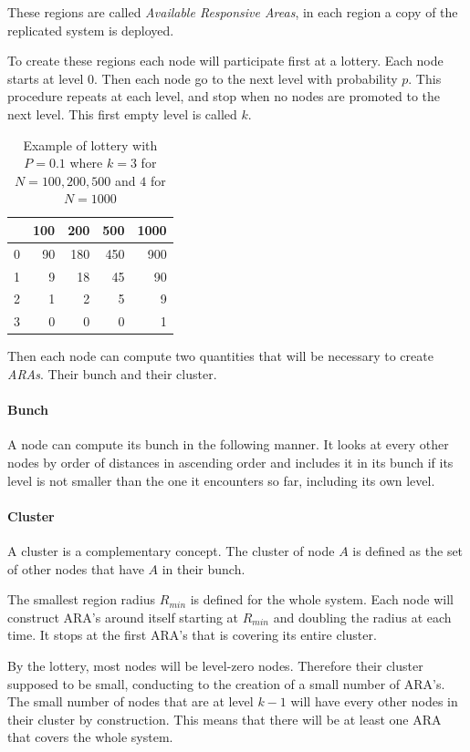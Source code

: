 \documentclass[a4paper,11pt,oneside]{report}
\begin{document}
These regions are called \textit{Available Responsive Areas}, in each region a
copy of the replicated system is deployed. 

To create these regions each node will participate first at a lottery. Each
node starts at level 0. Then each node go to the next level with probability
$p$. This procedure repeats at each level, and stop when no nodes are promoted
to the next level. This first empty level is called $k$. 

\begin{table}[] \begin{tabular}{rrrrr} & 100 & 200 & 500 & 1000 \\ \hline
\multicolumn{1}{r|}{0} & 90  & 180 & 450 & 900  \\ \multicolumn{1}{r|}{1} & 9
& 18  & 45  & 90   \\ \multicolumn{1}{r|}{2} & 1   & 2   & 5   & 9 \\
\multicolumn{1}{r|}{3} & 0   & 0   & 0   & 1   \end{tabular} \caption{Example
of lottery with $P = 0.1$ where $k= 3$ for $N= 100,200,500$ and $4$ for $N =
1000$} \end{table}

Then each node can compute two quantities that will be necessary to create
\textit{ARAs}. Their bunch and their cluster. 

\paragraph{Bunch} A node can compute its bunch in the following manner. It
looks at every other nodes by order of distances in ascending order and
includes it in its bunch if its level is not smaller than the one it encounters
so far, including its own level. 


\paragraph{Cluster} A cluster is a complementary concept. The cluster of node
$A$ is defined as the set of other nodes that have $A$ in their bunch. 

The smallest region radius $R_{min}$ is defined for the whole system. Each node
will construct ARA's around itself starting at $R_{min}$ and doubling the
radius at each time. It stops at the first ARA's that is covering its entire
cluster. 

By the lottery, most nodes will be level-zero nodes. Therefore their cluster
supposed to be small, conducting to the creation of a small number of ARA's.
The small number of nodes that are at level $k-1$ will have every other nodes
in their cluster by construction. This means that there will be at least one
ARA that covers the whole system. 
\end{document}
